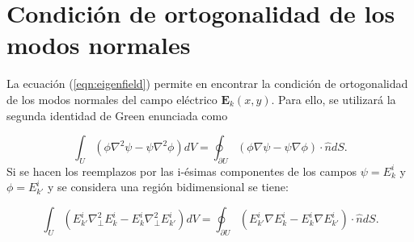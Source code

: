 \chapter{Condición de ortogonalidad de los modos normales \label{sec:orto}}

La ecuación (\ref{eqn:eigenfield}) permite en encontrar la condición de ortogonalidad de los modos normales del campo eléctrico  $\textbf{E}_k(x,y)$. Para ello, se utilizará la segunda identidad de Green \cite{jackson_classical_1999} enunciada como

\begin{equation*}
	\int_U \left(\phi \nabla^2 \psi - \psi \nabla^2 \phi\right) dV = \oint_{\partial U} \left(\phi \nabla \psi - \psi \nabla \phi\right) \cdot \hat{n} dS.
\end{equation*}
Si se hacen los reemplazos por las i-ésimas componentes de los campos $\psi = E_k^i$ y $\phi = E_{k'}^i$ y se considera una región bidimensional se tiene:

\begin{equation*}
	\int_U \left(E_{k'}^i \nabla_\perp^2 E_k^i - E_k^i \nabla_\perp^2 E_{k'}^i\right) dV = \oint_{\partial U} \left(E_{k'}^i \nabla E_k^i - E_k^i \nabla E_{k'}^i\right) \cdot \hat{n} dS.
\end{equation*}